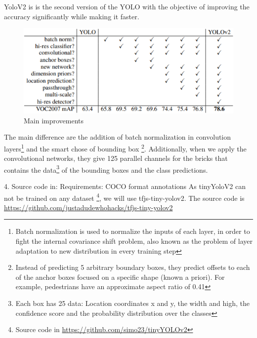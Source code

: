 \documentclass[10pt]{article}
\begin{document}
YoloV2 is is the second version of the YOLO with the objective of improving the accuracy significantly while making it faster. 
\begin{figure}[H]
  	\centering
    \includegraphics[scale=0.8]{YOLOV23.PNG}
    \caption{ Main improvements \cite{redmon2017yolo9000}}
\end{figure}

The main difference are the addition of batch normalization \cite{ioffe2015batch} in convolution layers\footnote{Batch normalization is used to normalize the inputs of each layer, in order to fight the internal covariance shift problem, also known as the problem of layer adaptation to new distribution in every training step} and the smart chose of bounding box \footnote{Instead of predicting 5 arbitrary boundary boxes, they predict offsets to each of the anchor boxes focused on a specific shape (known a priori). For example, pedestrians have an approximate aspect ratio of 0.41}. Additionally, when we apply the convolutional networks, they give 125 parallel channels for the bricks that contains the data\footnote{Each box has 25 data: Location coordinates x and y, the width and high, the conﬁdence score and the probability distribution over the classes} of the bounding boxes and the class predictions. 

4. Source code in: 
Requirements: COCO format annotations
As tinyYoloV2 can not be trained on any dataset \footnote{ Source code in \url{https://github.com/simo23/tinyYOLOv2}}, we will use tfjs-tiny-yolov2. The source code is \url{https://github.com/justadudewhohacks/tfjs-tiny-yolov2}
\end{document}
